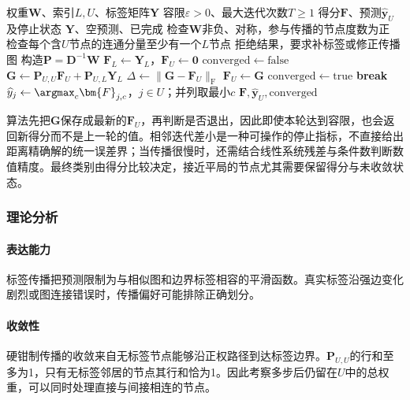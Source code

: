 \begin{algorithm}[硬钳制标签传播]
  \label{alg:classification-label-propagation}
  \begin{algorithmic}[1]
    \Require 权重$\bm{W}$、索引$L,U$、标签矩阵$\bm{Y}$
    \Require 容限$\varepsilon>0$、最大迭代次数$T\geq1$
    \Ensure 得分$\bm{F}$、预测$\widehat{\bm{y}}_U$及停止状态
      \State \Return $\bm{Y}$、空预测、已完成
    \EndIf
    \State 检查$\bm{W}$非负、对称，参与传播的节点度数为正
    \State 检查每个含$U$节点的连通分量至少有一个$L$节点
      \State \Return 拒绝结果，要求补标签或修正传播图
    \EndIf
    \State 构造$\bm{P}=\bm{D}^{-1}\bm{W}$
    \State $\bm{F}_L\gets\bm{Y}_L$，$\bm{F}_U\gets\bm{0}$
    \State $\mathrm{converged}\gets\mathrm{false}$
      \State $\bm{G}\gets\bm{P}_{U,U}\bm{F}_U+\bm{P}_{U,L}\bm{Y}_L$
      \State $\Delta\gets\lVert\bm{G}-\bm{F}_U\rVert_{\mathrm{F}}$
      \State $\bm{F}_U\gets\bm{G}$
        \State $\mathrm{converged}\gets\mathrm{true}$
        \State \textbf{break}
      \EndIf
    \EndFor
    \State $\widehat y_j\gets\argmax_c\bm{F}_{j,c}$，$j\in U$；并列取最小$c$
    \State \Return $\bm{F},\widehat{\bm{y}}_U,\mathrm{converged}$
  \end{algorithmic}
\end{algorithm}

算法先把$\bm{G}$保存成最新的$\bm{F}_U$，再判断是否退出，因此即使本轮达到容限，也会返回新得分而不是上一轮的值。相邻迭代差小是一种可操作的停止指标，不直接给出距离精确解的统一误差界；当传播很慢时，还需结合线性系统残差与条件数判断数值精度。最终类别由得分比较决定，接近平局的节点尤其需要保留得分与未收敛状态。

\subsubsection{理论分析}
\label{sec:classification-label-propagation-analysis}

\paragraph{表达能力}
标签传播把预测限制为与相似图和边界标签相容的平滑函数。真实标签沿强边变化剧烈或图连接错误时，传播偏好可能排除正确划分。

\paragraph{收敛性}
硬钳制传播的收敛来自无标签节点能够沿正权路径到达标签边界。$\bm{P}_{U,U}$的行和至多为1，只有无标签邻居的节点其行和恰为1。因此考察多步后仍留在$U$中的总权重，可以同时处理直接与间接相连的节点。

